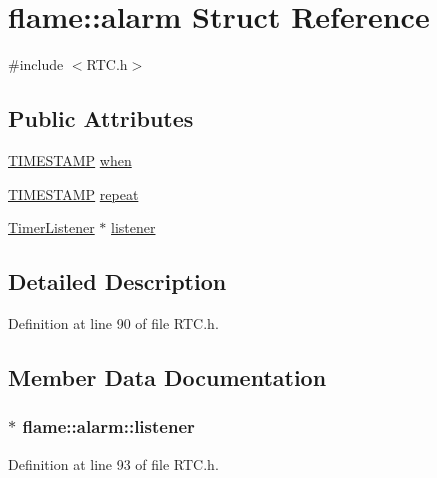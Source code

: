\hypertarget{structflame_1_1alarm}{\section{flame\-:\-:alarm Struct Reference}
\label{structflame_1_1alarm}
}


{\ttfamily \#include $<$R\-T\-C.\-h$>$}

\subsection*{Public Attributes}
\begin{DoxyCompactItemize}
\item 
\hyperlink{namespaceflame_ad90347e9ea7e54907966260ec5c7d22f}{T\-I\-M\-E\-S\-T\-A\-M\-P} \hyperlink{structflame_1_1alarm_a5c2cc1d3e96943a144f6f965b1561e00}{when}
\item 
\hyperlink{namespaceflame_ad90347e9ea7e54907966260ec5c7d22f}{T\-I\-M\-E\-S\-T\-A\-M\-P} \hyperlink{structflame_1_1alarm_a66e4634a1965c119d7d39798056b7340}{repeat}
\item 
\hyperlink{classflame_1_1_timer_listener}{Timer\-Listener} $\ast$ \hyperlink{structflame_1_1alarm_ac21df9b77c10cdc77c0a0c29d6ada66b}{listener}
\end{DoxyCompactItemize}


\subsection{Detailed Description}


Definition at line 90 of file R\-T\-C.\-h.



\subsection{Member Data Documentation}
\hypertarget{structflame_1_1alarm_ac21df9b77c10cdc77c0a0c29d6ada66b}{
\subsubsection[{listener}]{$\ast$ flame\-::alarm\-::listener}}\label{structflame_1_1alarm_ac21df9b77c10cdc77c0a0c29d6ada66b}


Definition at line 93 of file R\-T\-C.\-h.

